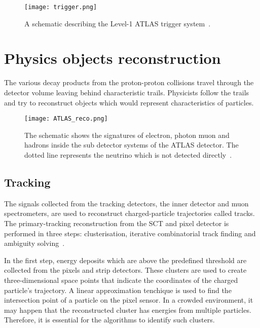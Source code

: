\begin{figure}[htbp]
    \centering
    \texttt{[image: trigger.png]}
    \caption[Sketch of the ATLAS calorimeters]{A schematic describing the Level-1 ATLAS trigger system~\cite{Simioni:2305791}.}%
    \label{fig:trigger}
\end{figure}

\section{Physics objects reconstruction}
\label{sec:ATLASrecon}
The various decay products from the proton-proton collisions travel through the detector volume leaving
behind characteristic trails. Physicists follow the trails and try to reconstruct objects which would 
represent characteristics of particles.

\begin{figure}[htbp]
    \centering
    \texttt{[image: ATLAS\_reco.png]}
    \caption[Sketch of the ATLAS calorimeters]{The schematic shows the signatures of electron, photon
    muon and hadrons inside the sub detector systems of the ATLAS detector. The dotted line represents
    the neutrino which is not detected directly~\cite{Mehlhase:2770815}.}%
    \label{fig:ATLASreco}
\end{figure}

\subsection{Tracking}
The signals collected from the tracking detectors, the inner detector and muon spectrometers, are used to reconstruct charged-particle trajectories called tracks. The primary-tracking
reconstruction from the SCT and pixel detector is performed in three steps: clusterisation, iterative combinatorial track finding and ambiguity solving~\cite{PERF-2015-07}. 

In the first step, energy deposits which are above the predefined threshold are collected from the pixels and strip detectors. These clusters are used to create
three-dimensional space points that indicate the coordinates of the charged particle's trajectory. A linear approximation tenchique is used to find the intersection
point of a particle on the pixel sensor. In a crowded environment, it may happen that the reconstructed cluster has energies from multiple particles. Therefore,
it is essential for the algorithms to identify such clusters. 

